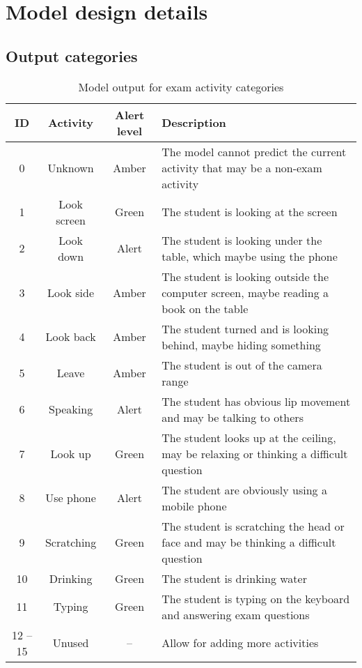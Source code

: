 \chapter{Model design details}
\section{Output categories}
\label{sec:Output categories}
\begin{table}[!ht]
\renewcommand{\arraystretch}{1.6}
\newcommand{\green}{\color{caribbeangreen} Green}
\newcommand{\amber}{\color{amber} Amber}
\newcommand{\red}{\color{carminered} Alert}
\begin{tabularx}{\textwidth}{|c|c|c|X|}
\hline
ID & Activity    & Alert level & Description \\ \hline
0           & Unknown     & \amber & The model cannot predict the current activity that may be a non-exam activity \\ \hline
1           & Look screen & \green & The student is looking at the screen \\ \hline
2           & Look down   & \red   & The student is looking under the table, which maybe using the phone \\ \hline
3           & Look side   & \amber & The student is looking outside the computer screen, maybe reading a book on the table \\ \hline
4           & Look back   & \amber & The student turned and is looking behind, maybe hiding something \\ \hline
5           & Leave       & \amber & The student is out of the camera range \\ \hline
6           & Speaking    & \red   & The student has obvious lip movement and may be talking to others \\ \hline
7           & Look up     & \green & The student looks up at the ceiling, may be relaxing or thinking a difficult question \\ \hline
8           & Use phone   & \red   & The student are obviously using a mobile phone \\ \hline
9           & Scratching  & \green & The student is scratching the head or face and may be thinking a difficult question \\ \hline
10          & Drinking    & \green & The student is drinking water \\ \hline
11          & Typing      & \green & The student is typing on the keyboard and answering exam questions \\ \hline
12 -- 15    & Unused      & --     & Allow for adding more activities \\ \hline
\end{tabularx}
\caption{Model output for exam activity categories}
\label{tab:Model output}
\end{table}

